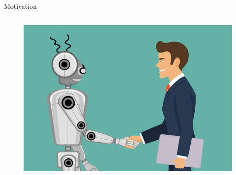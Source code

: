 \documentclass[10pt,a4paper,openany]{beamer}
\begin{document}
\begin{frame}{Motivation}
\begin{columns}
\begin{column}{0.5\textwidth}
\begin{figure}[htbp]
					\label{fig_motivation3}
				\end{figure}
				\begin{figure}[htbp]
					\centerline{\includegraphics[scale=0.22]{charts/motivation3.png}}
					\label{fig_motivation4}
				\end{figure}
			\end{column}
		\end{columns}
	\end{frame}
\end{document}
